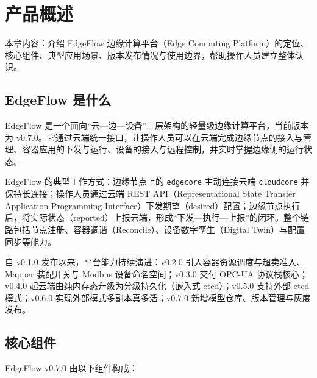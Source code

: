 \chapter{产品概述}
\label{ch:1}

本章内容：介绍 EdgeFlow 边缘计算平台（Edge Computing Platform）的定位、核心组件、典型应用场景、版本发布情况与使用边界，帮助操作人员建立整体认识。

\section{EdgeFlow 是什么}

EdgeFlow 是一个面向“云—边—设备”三层架构的轻量级边缘计算平台，当前版本为 v0.7.0。它通过云端统一接口，让操作人员可以在云端完成边缘节点的接入与管理、容器应用的下发与运行、设备的接入与远程控制，并实时掌握边缘侧的运行状态。

EdgeFlow 的典型工作方式：边缘节点上的 \texttt{edgecore} 主动连接云端 \texttt{cloudcore} 并保持长连接；操作人员通过云端 REST API（Representational State Transfer Application Programming Interface）下发期望（desired）配置；边缘节点执行后，将实际状态（reported）上报云端，形成“下发—执行—上报”的闭环。整个链路包括节点注册、容器调谐（Reconcile）、设备数字孪生（Digital Twin）与配置同步等能力。

自 v0.1.0 发布以来，平台能力持续演进：v0.2.0 引入容器资源调度与超卖准入、Mapper 装配开关与 Modbus 设备命名空间；v0.3.0 交付 OPC-UA 协议栈核心；v0.4.0 起云端由纯内存态升级为分级持久化（嵌入式 etcd）；v0.5.0 支持外部 etcd 模式；v0.6.0 实现外部模式多副本真多活；v0.7.0 新增模型仓库、版本管理与灰度发布。

\section{核心组件}

EdgeFlow v0.7.0 由以下组件构成：


